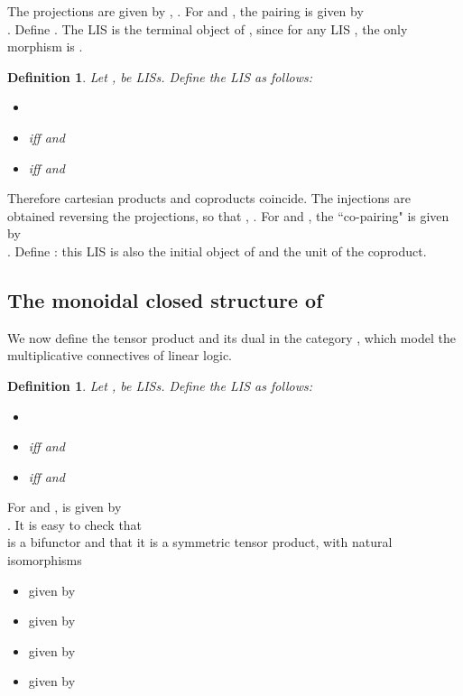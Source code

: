 \documentclass[copyright,creativecommons]{eptcs}
\newtheorem{definition}[theorem]{Definition}
\begin{document}
The projections  are given by \mbox{}, . For \mbox{} and \mbox{}, the pairing \mbox{} is given by \\ \mbox{.} Define . The LIS  is the terminal object of , since for any LIS , the only morphism  is .

\medskip

\begin{definition}
Let ,  be LISs. Define the LIS  as follows:
\begin{itemize}
\item 
\item  iff  and 
\item  iff  and 
\end{itemize}
\end{definition}

Therefore cartesian products and coproducts coincide. The injections  are obtained reversing the projections, so that \mbox{}, . For \mbox{} and \mbox{}, the ``co-pairing" \mbox{} is given by \\ \mbox{.} Define : this LIS is also the initial object of  and the unit of the coproduct.

\subsection{The monoidal closed structure of }

We now define the tensor product and its dual in the category , which model the multiplicative connectives of linear logic.

\medskip

\begin{definition}
Let ,  be LISs. Define the LIS  as follows:
\begin{itemize}
\item 
\item  iff  and 
\item  iff  and 
\end{itemize}
\end{definition}

For  and ,  is given by \\ \mbox{.} It is easy to check that \\ \mbox{} is a bifunctor and that it is a symmetric tensor product, with natural isomorphisms
\begin{itemize}
\item  given by 


\item  given by 

\item  given by 

\item  given by 
\end{itemize}
\end{document}
